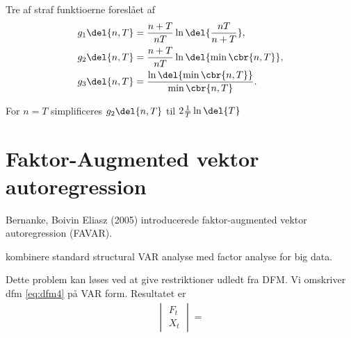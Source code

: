 Tre af straf funktioerne foreslået af \citep{Bai_Ng}
\begin{align*}
g_1 \del{n,T} &= \frac{n + T}{n T} \ln \del{\frac{nT}{n + T}}, \\
g_2 \del{n,T} &= \frac{n + T}{n T} \ln \del{ \min \cbr{n, T}}, \\
g_3 \del{n,T} &= \frac{\ln \del{\min \cbr{n, T}}}{\min \cbr{n, T}}.
\end{align*}

For \(n = T\) simplificeres \(g_2 \del{n,T} \) til \(2 \frac{1}{T} \ln \del{T}\)



\section{Faktor-Augmented vektor autoregression}
Bernanke, Boivin Eliasz (2005) introducerede faktor-augmented vektor autoregression (FAVAR).

kombinere standard structural VAR analyse med factor analyse for big data.

Dette problem kan løses ved at give restriktioner udledt fra DFM.
Vi omskriver dfm \eqref{eq:dfm4} på VAR form.
Resultatet er 
\begin{align*}
\begin{vmatrix}
F_t \\ X_t
\end{vmatrix} = 
\end{align*}